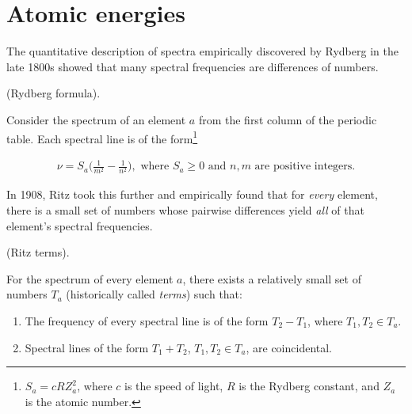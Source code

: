 \documentclass{article}
\begin{document}
\section*{Atomic energies}

The quantitative description of spectra empirically discovered by Rydberg in the late 1800s showed that many spectral frequencies are differences of numbers.

\begin{axiom}
	(Rydberg formula).
	
	Consider the spectrum of an element $a$ from the first column of the periodic table. Each spectral line is of the form\footnote{$S_a = cRZ_a^2$, where $c$ is the speed of light, $R$ is the Rydberg constant, and $Z_a$ is the atomic number.}
	
	\begin{align*}
		\nu = S_a \Big(\frac{1}{m^2} - \frac{1}{n^2}\Big), \text{ where $S_a \geq 0$ and $n, m$ are positive integers}.
	\end{align*}
\end{axiom}

In 1908, Ritz took this further and empirically found that for \textit{every} element, there is a small set of numbers whose pairwise differences yield \textit{all} of that element's spectral frequencies.

\begin{axiom}
	(Ritz terms).
	
	For the spectrum of every element $a$, there exists a relatively small set of numbers $T_a$ (historically called \textit{terms}) such that:
	
	\begin{enumerate}
		\item The frequency of every spectral line is of the form $T_2 - T_1$, where $T_1, T_2 \in T_a$.
		\item Spectral lines of the form $T_1 + T_2$, $T_1, T_2 \in T_a$, are coincidental.
	\end{enumerate}
\end{axiom}

%
%
\end{document}
